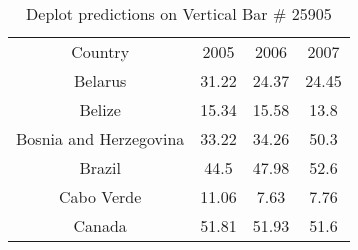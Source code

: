 \begin{table}
    \begin{tabular}{|c|c|c|c|}
Country & 2005 & 2006 & 2007 \\
Belarus & 31.22 & 24.37 & 24.45 \\
Belize & 15.34 & 15.58 & 13.8 \\
Bosnia and Herzegovina & 33.22 & 34.26 & 50.3 \\
Brazil & 44.5 & 47.98 & 52.6 \\
Cabo Verde & 11.06 & 7.63 & 7.76 \\
Canada & 51.81 & 51.93 & 51.6 \\
\end{tabular}
\caption{Deplot predictions on Vertical Bar \# 25905}
    \label{tab:deplot-plotqa-vbar-25905}
\end{table}
